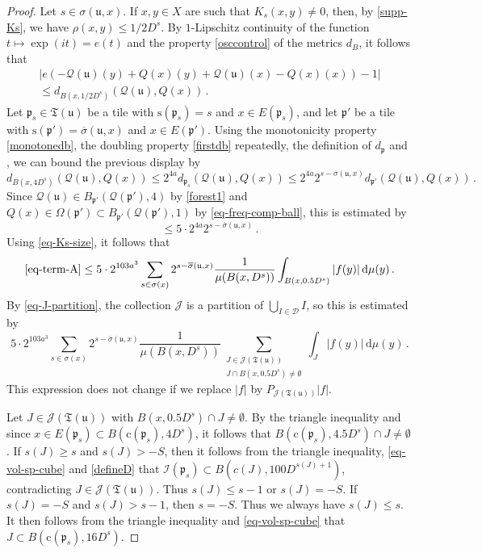 \documentclass[10pt,a4paper]{article}
\theoremstyle{plain}
\theoremstyle{definition}
\numberwithin{equation}{subsection}
\newcommand{\fp}{{\mathfrak p}}
\newcommand{\fu}{{\mathfrak u}}
\newcommand{\fT}{{\mathfrak T}}
\newcommand{\pc}{{\mathrm{c}}}
\newcommand{\ps}{{\mathrm{s}}}
\newcommand{\scI}{{\mathcal{I}}} %
\newcommand{\tQ}{{Q}}
\newcommand{\fcc}{{\mathcal{Q}}}
\newcommand{\leanok}{}
\begin{document}
\begin{proof}
    \leanok
    Let $s \in \sigma(\fu,x)$.
    If $x, y \in X$ are such that $K_s(x,y)\neq 0$, then, by \eqref{supp-Ks}, we have $\rho(x,y)\leq 1/2 D^s$. By $1$-Lipschitz continuity of the function $t \mapsto \exp(it) = e(t)$ and the property \eqref{osccontrol} of the metrics $d_B$, it follows that
    \begin{multline*}
        |e(-\fcc(\fu)(y)+\tQ(x)(y)+\fcc(\fu)(x)-\tQ(x)(x))-1|\\
        \leq d_{B(x, 1/2 D^{s})}(\fcc(\fu), \tQ(x))\,.
    \end{multline*}
    Let $\fp_s \in \fT(\fu)$ be a tile with $\ps(\fp_s) = s$ and $x \in E(\fp_s)$, and let $\fp'$ be a tile with $\ps(\fp') = \overline{\sigma}(\fu, x)$ and $x \in E(\fp')$.
    Using the monotonicity property \eqref{monotonedb}, the doubling property \eqref{firstdb} repeatedly, the definition of $d_{\fp}$ and , we can bound the previous display by
    $$
        d_{B(x, 4 D^{s})}(\fcc(\fu), \tQ(x)) \leq 2^{4a} d_{\fp_s}(\fcc(\fu), \tQ(x)) \le 2^{4a} 2^{s - \overline{\sigma}(\fu, x)} d_{\fp'}(\fcc(\fu), \tQ(x))\,.
    $$
    Since $\fcc(\fu) \in B_{\fp'}(\fcc(\fp'), 4)$ by \eqref{forest1} and $\tQ(x) \in \Omega(\fp') \subset B_{\fp'}(\fcc(\fp'), 1)$ by \eqref{eq-freq-comp-ball}, this is estimated by
    $$
        \le 5 \cdot 2^{4a} 2^{s - \overline{\sigma}(\fu, x)} \,.
    $$
    Using \eqref{eq-Ks-size}, it follows that
    $$
        \eqref{eq-term-A} \le 5\cdot 2^{103a^3} \sum_{s\in\sigma(x)}2^{s - \overline{\sigma}(\fu, x)} \frac{1}{\mu(B(x,D^s))}\int_{B(x,0.5D^{s})}|f(y)|\,\mathrm{d}\mu(y)\,.
    $$
    By \eqref{eq-J-partition}, the collection $\mathcal{J}$ is a partition of $\bigcup_{I \in \mathcal{D}} I$, so this is estimated by
    $$
         5\cdot 2^{103a^3} \sum_{s\in\sigma(x)}2^{s - \overline{\sigma}(\fu, x)} \frac{1}{\mu(B(x,D^s))}\sum_{\substack{J \in \mathcal{J}(\fT(\fu))\\J \cap B(x, 0.5D^s) \ne \emptyset} }\int_{J}|f(y)|\,\mathrm{d}\mu(y)\,.
    $$
    This expression does not change if we replace $|f|$ by $P_{\mathcal{J}(\fT(\fu))}|f|$.

    Let $J \in \mathcal{J}(\fT(\fu))$ with $B(x, 0.5 D^s) \cap J \ne \emptyset$. By the triangle inequality and since $x \in E(\fp_s) \subset B(\pc(\fp_s), 4D^{s})$, it follows that $B(\pc(\fp_s), 4.5D^s) \cap J \ne \emptyset$. If $s(J) \ge s$ and $s(J) > -S$, then it follows from the triangle inequality, \eqref{eq-vol-sp-cube} and \eqref{defineD} that $\scI(\fp_s) \subset B(c(J), 100 D^{s(J)+1})$, contradicting $J \in \mathcal{J}(\mathfrak{T}(\fu))$. Thus $s(J) \le s - 1$ or $s(J) = -S$. If $s(J) = -S$ and $s(J) > s - 1$, then $s = -S$. Thus we always have $s(J) \le s$. It then follows from the triangle inequality and \eqref{eq-vol-sp-cube} that $J \subset B(\pc(\fp_s), 16 D^s)$.


\end{proof}
\end{document}
